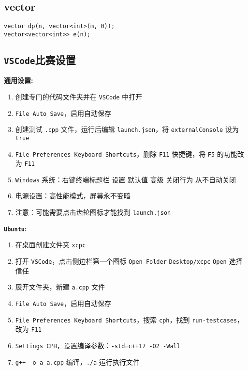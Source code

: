 \documentclass[a4paper, fontset=none]{ctexart}
\begin{document}
\subsection{vector}

\begin{verbatim}
vector dp(n, vector<int>(m, 0));
vector<vector<int>> e(n);
\end{verbatim}
\subsection{\texttt{VSCode}比赛设置}

\textbf{通用设置:}
\begin{enumerate}
\item 创建专门的代码文件夹并在 \texttt{VSCode} 中打开
\item \texttt{File \textrightarrow{} Auto Save}，启用自动保存
\item 创建测试 \texttt{.cpp} 文件，运行后编辑 \texttt{launch.json}，将 \texttt{externalConsole} 设为 \texttt{true}
\item \texttt{File \textrightarrow{} Preferences \textrightarrow{} Keyboard Shortcuts}，删除 \texttt{F11} 快捷键，将 \texttt{F5} 的功能改为 \texttt{F11}
\item \texttt{Windows} 系统：右键终端标题栏 \textrightarrow{} 设置 \textrightarrow{} 默认值 \textrightarrow{} 高级 \textrightarrow{} 关闭行为 \textrightarrow{} 从不自动关闭
\item 电源设置：高性能模式，屏幕永不变暗
\item 注意：可能需要点击齿轮图标才能找到 \texttt{launch.json}
\end{enumerate}

\textbf{\texttt{Ubuntu}:}
\begin{enumerate}
\item 在桌面创建文件夹 \texttt{xcpc}
\item 打开 \texttt{VSCode}，点击侧边栏第一个图标 \textrightarrow{} \texttt{Open Folder} \textrightarrow{} \texttt{Desktop/xcpc} \textrightarrow{} \texttt{Open} \textrightarrow{} 选择信任
\item 展开文件夹，新建 \texttt{a.cpp} 文件
\item \texttt{File \textrightarrow{} Auto Save}，启用自动保存
\item \texttt{File \textrightarrow{} Preferences \textrightarrow{} Keyboard Shortcuts}，搜索 \texttt{cph}，找到 \texttt{run-testcases}，改为 \texttt{F11}
\item \texttt{Settings \textrightarrow{} CPH}，设置编译参数：\texttt{-std=c++17 -O2 -Wall}
\item \texttt{g++ -o a a.cpp} 编译，\texttt{./a} 运行执行文件
\end{enumerate}
\end{document}
